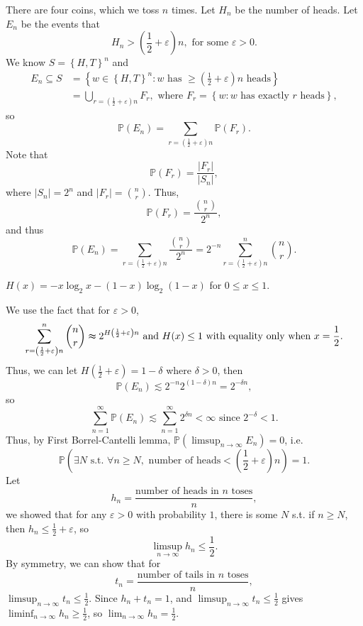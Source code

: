 \begin{eg}
    There are four coins, which we toss \(n\) times. Let \(H_n\) be the number of heads. Let \(E_n\) be the events that 
    \[
        H_n > \left( \frac{1}{2} + \varepsilon \right)n, \text{ for some } \varepsilon > 0.   
    \]   
    We know \(S = \left\{ H, T \right\}^n \) and 
    \begin{align*}
        E_n \subseteq S &= \left\{ w \in \left\{ H, T \right\}^n : w \text{ has } \ge \left( \frac{1}{2} + \varepsilon \right)n \text{ heads}     \right\} \\
        &= \bigcup_{r = \left( \frac{1}{2} + \varepsilon \right)n } F_r, \text{ where } F_r = \left\{ w: w \text{ has exactly } r \text{ heads}   \right\},    
    \end{align*} 
    so 
    \[
        \mathbb{P} (E_n) = \sum_{r = \left( \frac{1}{2} + \varepsilon \right)n } \mathbb{P} (F_r). 
    \]
    Note that 
    \[
        \mathbb{P} (F_r) = \frac{\vert F_r \vert }{\vert S_n \vert },
    \] where \(\vert S_n \vert = 2^n \) and \(\vert F_r \vert = \binom{n}{r} \). Thus,
    \[
        \mathbb{P} (F_r) = \frac{\binom{n}{r}}{2^n},
    \]  
    and thus 
    \[
        \mathbb{P} (E_n) = \sum_{r = \left( \frac{1}{2} + \varepsilon \right)n } \frac{\binom{n}{r}}{2^n} = 2^{-n} \sum_{r = \left( \frac{1}{2} + \varepsilon \right)n }^n \binom{n}{r}. 
    \]
    \begin{definition}
        \(H(x) = - x \log_2 x - (1 - x) \log _2(1 - x)\) for \(0 \le x \le 1\).  
    \end{definition}
    We use the fact that for \(\varepsilon > 0\), 
    \[
        \sum_{r = \left( \frac{1}{2} + \varepsilon \right)n }^n \binom{n}{r} \thickapprox 2^{H\left( \frac{1}{2} + \varepsilon \right)n } \text{ and } H(x) \le 1 \text{ with equality only when } x=\frac{1}{2}.   
    \]
    Thus, we can let \(H\left( \frac{1}{2} + \varepsilon \right) = 1 - \delta  \) where \(\delta > 0\), then 
    \[
        \mathbb{P} (E_n) \lesssim 2^{-n} 2^{(1 - \delta) n} = 2^{-\delta n},
    \]
    so 
    \[
        \sum_{n=1}^{\infty} \mathbb{P} (E_n) \lesssim \sum_{n=1}^{\infty} 2^{\delta n} < \infty \text{ since } 2^{-\delta } < 1.   
    \]
    Thus, by First Borrel-Cantelli lemma, \(\mathbb{P} (\limsup_{n \to \infty} E_n ) = 0\), i.e. 
    \[
        \mathbb{P} \left( \exists N \text{ s.t. } \forall n \ge N, \text{ number of heads} < \left( \frac{1}{2} + \varepsilon \right)n    \right) = 1. 
    \]   
    Let 
    \[
        h_n = \frac{\text{number of heads in } n \text{ toses} }{n},
    \]
    we showed that for any \(\varepsilon > 0\) with probability \(1\), there is some \(N\) s.t. if \(n \ge N\), then \(h_n \le \frac{1}{2} + \varepsilon\), so 
    \[
        \limsup_{n \to \infty} h_n \le \frac{1}{2}.
    \]     
    By symmetry, we can show that for 
    \[
        t_n = \frac{\text{number of tails in } n \text{ toses} }{n}, 
    \]
    \(\limsup_{n \to \infty} t_n \le \frac{1}{2} \). Since \(h_n + t_n = 1\), and \(\limsup_{n \to \infty} t_n \le \frac{1}{2} \) gives \(\liminf_{n \to \infty} h_n \ge \frac{1}{2} \), so \(\lim_{n \to \infty} h_n = \frac{1}{2} \).     
\end{eg}

